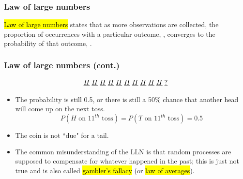 \documentclass[slidestop,compress,mathserif]{beamer}
\begin{document}

\begin{frame}
\frametitle{Law of large numbers}

\hl{Law of large numbers} states that as more observations are collected, the proportion of occurrences with a particular outcome, , converges to the probability of that outcome, .

\end{frame}


\begin{frame}
\frametitle{Law of large numbers (cont.)}


\[ \underline{H} \hspace{1mm} \underline{H} \hspace{1mm} \underline{H} \hspace{1mm} \underline{H} \hspace{1mm} \underline{H} \hspace{1mm} \underline{H} \hspace{1mm} \underline{H} \hspace{1mm} \underline{H} \hspace{1mm} \underline{H} \hspace{1mm} \underline{H} \hspace{1mm} \underline{?} \]

\begin{itemize}
\item<2-> The probability is still 0.5, or there is still a 50\% chance that another head will come up on the next toss.
\[ P(H \text{ on 11}^{th} \text{ toss}) = P(T \text{ on 11}^{th} \text{ toss}) = 0.5 \]
\item<3-> The coin is not ``due" for a tail.
\item<4-> The common misunderstanding of the LLN is that random processes are supposed to compensate for whatever happened in the past; this is just not true and is also called \hl{gambler's fallacy} (or \hl{law of averages}).
\end{itemize}

\end{frame}

\end{document}
